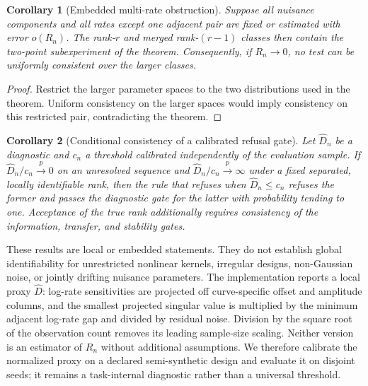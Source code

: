 \documentclass[11pt]{article}
\newtheorem{corollary}{Corollary}
\begin{document}
\begin{corollary}[Embedded multi-rate obstruction]
Suppose all nuisance components and all rates except one adjacent pair are fixed or estimated with error $o(R_n)$. The rank-$r$ and merged rank-$(r-1)$ classes then contain the two-point subexperiment of the theorem. Consequently, if $R_n\to0$, no test can be uniformly consistent over the larger classes.
\end{corollary}
\begin{proof}
Restrict the larger parameter spaces to the two distributions used in the theorem. Uniform consistency on the larger spaces would imply consistency on this restricted pair, contradicting the theorem.
\end{proof}
\begin{corollary}[Conditional consistency of a calibrated refusal gate]
Let $\widehat D_n$ be a diagnostic and $c_n$ a threshold calibrated independently of the evaluation sample. If $\widehat D_n/c_n\stackrel{p}{\to}0$ on an unresolved sequence and $\widehat D_n/c_n\stackrel{p}{\to}\infty$ under a fixed separated, locally identifiable rank, then the rule that refuses when $\widehat D_n\le c_n$ refuses the former and passes the diagnostic gate for the latter with probability tending to one. Acceptance of the true rank additionally requires consistency of the information, transfer, and stability gates.
\end{corollary}

These results are local or embedded statements. They do not establish global identifiability for unrestricted nonlinear kernels, irregular designs, non-Gaussian noise, or jointly drifting nuisance parameters. The implementation reports a local proxy $\widehat D$: log-rate sensitivities are projected off curve-specific offset and amplitude columns, and the smallest projected singular value is multiplied by the minimum adjacent log-rate gap and divided by residual noise. Division by the square root of the observation count removes its leading sample-size scaling. Neither version is an estimator of $R_n$ without additional assumptions. We therefore calibrate the normalized proxy on a declared semi-synthetic design and evaluate it on disjoint seeds; it remains a task-internal diagnostic rather than a universal threshold.
\end{document}
